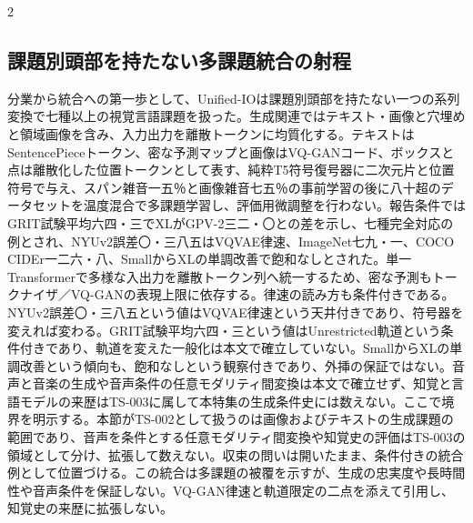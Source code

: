 \documentclass[lualatex,a4paper,10pt]{jlreq}
\begin{document}
\begin{multicols}{2}
\subsection{課題別頭部を持たない多課題統合の射程}
分業から統合への第一歩として、Unified-IOは課題別頭部を持たない一つの系列変換で七種以上の視覚言語課題を扱った。生成関連ではテキスト・画像と穴埋めと領域画像を含み、入力出力を離散トークンに均質化する。テキストはSentencePieceトークン、密な予測マップと画像はVQ-GANコード、ボックスと点は離散化した位置トークンとして表す、純粋T5符号復号器に二次元片と位置符号で与え、スパン雑音一五％と画像雑音七五％の事前学習の後に八十超のデータセットを温度混合で多課題学習し、評価用微調整を行わない\autocite{btd094}。報告条件ではGRIT試験平均六四・三でXLがGPV-2三二・〇との差を示し、七種完全対応の例とされ、NYUv2誤差〇・三八五はVQVAE律速、ImageNet七九・一、COCO CIDEr一二六・八、SmallからXLの単調改善で飽和なしとされた\autocite{btd094}。単一Transformerで多様な入出力を離散トークン列へ統一するため、密な予測もトークナイザ／VQ-GANの表現上限に依存する\autocite{btd094}。律速の読み方も条件付きである。NYUv2誤差〇・三八五という値はVQVAE律速という天井付きであり、符号器を変えれば変わる。GRIT試験平均六四・三という値はUnrestricted軌道という条件付きであり、軌道を変えた一般化は本文で確立していない。SmallからXLの単調改善という傾向も、飽和なしという観察付きであり、外挿の保証ではない\autocite{btd094}。音声と音楽の生成や音声条件の任意モダリティ間変換は本文で確立せず、知覚と言語モデルの来歴はTS-003に属して本特集の生成条件史には数えない。ここで境界を明示する。本節がTS-002として扱うのは画像およびテキストの生成課題の範囲であり、音声を条件とする任意モダリティ間変換や知覚史の評価はTS-003の領域として分け、拡張して数えない。収束の問いは開いたまま、条件付きの統合例として位置づける。この統合は多課題の被覆を示すが、生成の忠実度や長時間性や音声条件を保証しない。VQ-GAN律速と軌道限定の二点を添えて引用し、知覚史の来歴に拡張しない。


\end{multicols}
\end{document}
